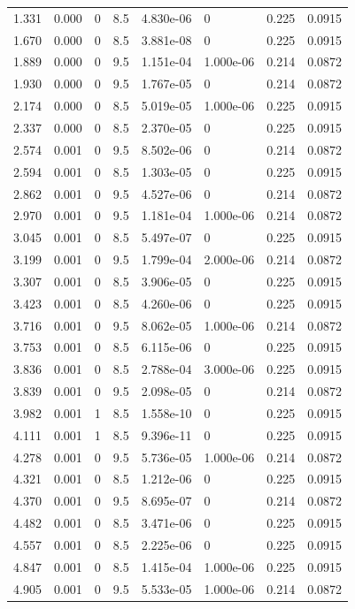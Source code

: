\documentclass[preview]{standalone}
\begin{document}
{{\begin{tabular}{L{1.2cm}C{1.2cm} C{0.3cm}C{0.5cm} C{1.4cm}C{1.4cm} C{1.4cm}C{1.4cm}}
  1.331  &  0.000  & 0     & 8.5 &  4.830e-06  & 0  & 0.225 &  0.0915   \\ 
  1.670  &  0.000  & 0     & 8.5 &  3.881e-08  & 0  & 0.225 &  0.0915   \\ 
  1.889  &  0.000  & 0     & 9.5 &  1.151e-04  & 1.000e-06  & 0.214 &  0.0872   \\ 
  1.930  &  0.000  & 0     & 9.5 &  1.767e-05  & 0  & 0.214 &  0.0872   \\ 
  2.174  &  0.000  & 0     & 8.5 &  5.019e-05  & 1.000e-06  & 0.225 &  0.0915   \\ 
  2.337  &  0.000  & 0     & 8.5 &  2.370e-05  & 0  & 0.225 &  0.0915   \\ 
  2.574  &  0.001  & 0     & 9.5 &  8.502e-06  & 0  & 0.214 &  0.0872   \\ 
  2.594  &  0.001  & 0     & 8.5 &  1.303e-05  & 0  & 0.225 &  0.0915   \\ 
  2.862  &  0.001  & 0     & 9.5 &  4.527e-06  & 0  & 0.214 &  0.0872   \\ 
  2.970  &  0.001  & 0     & 9.5 &  1.181e-04  & 1.000e-06  & 0.214 &  0.0872   \\ 
  3.045  &  0.001  & 0     & 8.5 &  5.497e-07  & 0  & 0.225 &  0.0915   \\ 
  3.199  &  0.001  & 0     & 9.5 &  1.799e-04  & 2.000e-06  & 0.214 &  0.0872   \\ 
  3.307  &  0.001  & 0     & 8.5 &  3.906e-05  & 0  & 0.225 &  0.0915   \\ 
  3.423  &  0.001  & 0     & 8.5 &  4.260e-06  & 0  & 0.225 &  0.0915   \\ 
  3.716  &  0.001  & 0     & 9.5 &  8.062e-05  & 1.000e-06  & 0.214 &  0.0872   \\ 
  3.753  &  0.001  & 0     & 8.5 &  6.115e-06  & 0  & 0.225 &  0.0915   \\ 
  3.836  &  0.001  & 0     & 8.5 &  2.788e-04  & 3.000e-06  & 0.225 &  0.0915   \\ 
  3.839  &  0.001  & 0     & 9.5 &  2.098e-05  & 0  & 0.214 &  0.0872   \\ 
  3.982  &  0.001  & 1     & 8.5 &  1.558e-10  & 0  & 0.225 &  0.0915   \\ 
  4.111  &  0.001  & 1     & 8.5 &  9.396e-11  & 0  & 0.225 &  0.0915   \\ 
  4.278  &  0.001  & 0     & 9.5 &  5.736e-05  & 1.000e-06  & 0.214 &  0.0872   \\ 
  4.321  &  0.001  & 0     & 8.5 &  1.212e-06  & 0  & 0.225 &  0.0915   \\ 
  4.370  &  0.001  & 0     & 9.5 &  8.695e-07  & 0  & 0.214 &  0.0872   \\ 
  4.482  &  0.001  & 0     & 8.5 &  3.471e-06  & 0  & 0.225 &  0.0915   \\ 
  4.557  &  0.001  & 0     & 8.5 &  2.225e-06  & 0  & 0.225 &  0.0915   \\ 
  4.847  &  0.001  & 0     & 8.5 &  1.415e-04  & 1.000e-06  & 0.225 &  0.0915   \\ 
  4.905  &  0.001  & 0     & 9.5 &  5.533e-05  & 1.000e-06  & 0.214 &  0.0872   \\ 
\hline 
\end{tabular} 

}}
\end{document}
